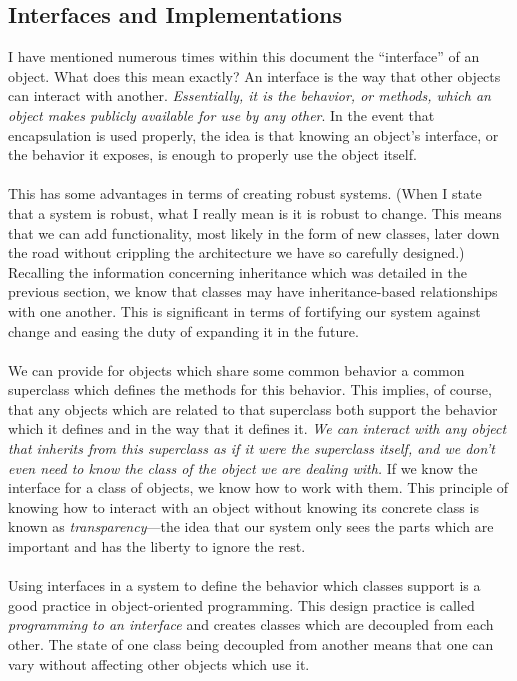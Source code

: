 \documentclass{article}
\begin{document}
\subsection{Interfaces and Implementations}
I have mentioned numerous times within this document the “interface” of an
object. What does this mean exactly? An interface is the way that other objects
can interact with another. \textit{Essentially, it is the behavior, or methods,
which an
object makes publicly available for use by any other}. In the event that
encapsulation is used properly, the idea is that knowing an object’s interface,
or the behavior it exposes, is enough to properly use the object itself.
\paragraph{}
This has some advantages in terms of creating robust systems. (When I state that
a system is robust, what I really mean is it is robust to change. This means
that we can add functionality, most likely in the form of new classes, later
down the road without crippling the architecture we have so carefully designed.)
Recalling the information concerning inheritance which was detailed in the
previous section, we know that classes may have inheritance-based relationships
with one another. This is significant in terms of fortifying our system against
change and easing the duty of expanding it in the future.
\paragraph{}
We can provide for objects which share some common behavior a common superclass 
which defines the methods for this behavior. This implies, of course, that any 
objects which are related to that superclass both support the behavior which it 
defines and in the way that it defines it. \textit{We can interact with any object 
that  inherits from this superclass as if it were the superclass itself, and we 
don’t even need to know the class of the object we are dealing with.} If we know 
the interface for a class of objects, we know how to work with them. This 
principle of knowing how to interact with an object without knowing its concrete 
class is known as \textit{transparency}---the idea that our system only sees the 
parts which are important and has the liberty to ignore the rest.
\paragraph{}
Using interfaces in a system to define the behavior which classes support is a
good practice in object-oriented programming. This design practice is called
\textit{programming to an interface} and creates classes which are
decoupled from each other. The state of one class being decoupled from another
means that one can vary without affecting other objects which use it. 
\end{document}
